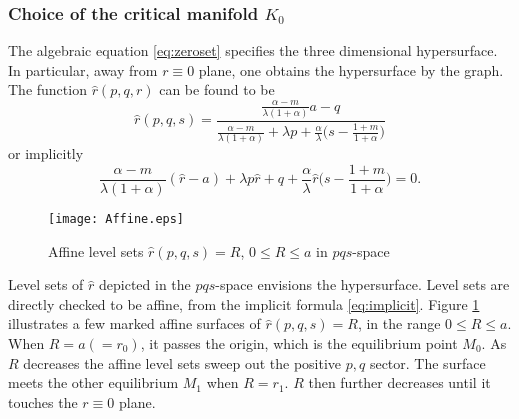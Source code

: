 \documentclass[a4paper,11pt]{article}
\theoremstyle{remark}
\begin{document}
\subsubsection{Choice of the critical manifold $K_0$}
The algebraic equation \eqref{eq:zeroset} specifies the three dimensional hypersurface. In particular, away from $r\equiv0$ plane, one obtains the hypersurface by the graph. The function $\hat{r}(p,q,r)$ can be found to be
\begin{equation*}
\hat{r}(p,q,s) = \frac{ \frac{\alpha-m}{\lambda(1+\alpha)}a - q }{  \frac{\alpha-m}{\lambda(1+\alpha)} + \lambda p + \frac{\alpha}{\lambda}\big(s- \frac{1+m}{1+\alpha}\big)}
\end{equation*}
or implicitly
\begin{equation}
\frac{\alpha-m}{\lambda(1+\alpha)}(\hat{r}-a) + \lambda p\hat{r} + q +\frac{\alpha}{\lambda}\hat{r}\big(s- \frac{1+m}{1+\alpha}\big)=0. \label{eq:implicit}
\end{equation}

\begin{figure}[ht]
 \centering
%
  \texttt{[image: Affine.eps]}
  \caption{Affine level sets $\hat{r}(p,q,s)=R$, $0\le R\le a$  in $pqs$-space} \label{fig:affine}
\end{figure}

Level sets of $\hat{r}$ depicted in the $pqs$-space envisions the hypersurface. Level sets are directly checked to be affine, from the implicit formula \eqref{eq:implicit}. Figure \ref{fig:affine} illustrates a few marked affine surfaces of $\hat{r}(p,q,s)=R$, in the range $0\le R\le a$. When $R=a(=r_0)$, it passes the origin, which is the equilibrium point $M_0$. As $R$ decreases the affine level sets sweep out the positive $p,q$ sector. The surface meets the other equilibrium $M_1$ when $R=r_1$. $R$ then further decreases until it touches the $r\equiv0$ plane.
\end{document}
